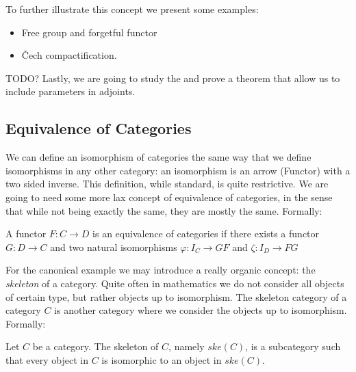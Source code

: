To further illustrate this concept we present some examples:
\begin{example}
  \begin{itemize}
  \item Free group and forgetful functor
  \item \v{C}ech compactification.
  \end{itemize}
\end{example}

{\color{red} TODO? Lastly, we are going to study the  and prove a theorem that allow us to include parameters in adjoints.}



\subsection{Equivalence of Categories}
We can define an isomorphism of categories the same way that we define isomorphisms in any other category: an isomorphism is an arrow (Functor) with a two sided inverse. This definition, while standard, is quite restrictive. We are going to need some more lax concept of equivalence of categories, in the sense that while not being exactly the same, they are mostly the same. Formally:

\begin{definition}
A functor $F:C\to D$ is an equivalence of categories if there exists a functor $G:D\to C$  and two natural isomorphisms $\varphi: I_C \to GF$ and $\zeta: I_D\to FG$
\end{definition}


For the canonical example we may introduce a really organic concept: the \emph{skeleton} of a category. Quite often in mathematics we do not consider all objects of certain type, but rather objects up to isomorphism. The skeleton category of a category $C$ is another category where we consider the objects up to isomorphism. Formally:
  \begin{definition}
    Let $C$ be a category. The skeleton of $C$, namely $ske(C)$, is a subcategory  such that every object in $C$ is isomorphic to an object in $ske(C)$.
  \end{definition}

